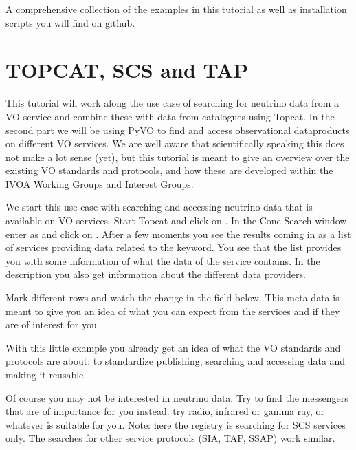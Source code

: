 \documentclass[twoside]{article}[12pt]
\begin{document}
A comprehensive collection of the examples in this tutorial as well as
installation scripts you will find on
\href{https://github.com/hendhd/ivoa_newcomers/tree/main/2021_northern_spring}{github}. 

\section {TOPCAT, SCS and TAP}
This tutorial will work along the use case of searching for neutrino
data from a VO-service and combine these with data from catalogues using
Topcat. In the second part we will be using PyVO to find and access
observational dataproducts on different VO services.
We are well aware that scientifically speaking this does not make a lot
sense (yet), but this tutorial is meant to give an overview over the
existing VO standards and protocols, and how these are developed within
the IVOA Working Groups and Interest Groups. 



We start this use case with searching and accessing neutrino data
that is available on VO services. Start Topcat and click on
\goto {}. In the Cone Search window enter
 as  and click on .
After a few moments you see the results coming in as a list of services
providing data related to the keyword. You see that the list provides
you with some information of what the data of the service contains. In
the description you also get information about the different data
providers.

\REGISTRYSTD

Mark different rows and watch the  change in the field below. This meta data is meant to give you an idea of what you can expect from the services and if they are of
interest for you.

With this little example you already get an idea of what the VO
standards and protocols are about: to standardize publishing, searching and
accessing data and making it reusable. 


\begin{exercise}Of course you may not be interested in neutrino data.
Try to find the messengers that are of importance for you instead: try radio,
infrared or gamma ray, or whatever is suitable for you. Note: here the
registry is searching for SCS services only. The searches for other
service protocols (SIA, TAP, SSAP) work similar. 
\end{exercise}
\end{document}
